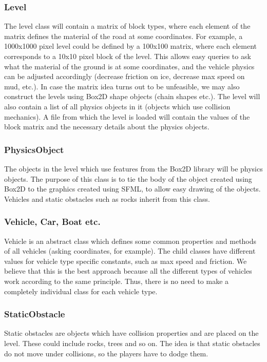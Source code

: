 \documentclass{article}
\begin{document}
\subsubsection*{Level}
The level class will contain a matrix of block types, where each element of the matrix defines the material of the road at some coordinates. For example, a 1000x1000 pixel level could be defined by a 100x100 matrix, where each element corresponds to a 10x10 pixel block of the level. This allows easy queries to ask what the material of the ground is at some coordinates, and the vehicle physics can be adjusted accordingly (decrease friction on ice, decrease max speed on mud, etc.). In case the matrix idea turns out to be unfeasible, we may also construct the levels using Box2D shape objects (chain shapes etc.). The level will also contain a list of all physics objects in it (objects which use collision mechanics). A file from which the level is loaded will contain the values of the block matrix and the necessary details about the physics objects.

\subsubsection*{PhysicsObject}
The objects in the level which use features from the Box2D library will be physics objects. The purpose of this class is to tie the body of the object created using Box2D to the graphics created using SFML, to allow easy drawing of the objects. Vehicles and static obstacles such as rocks inherit from this class.

\subsubsection*{Vehicle, Car, Boat etc.}
Vehicle is an abstract class which defines some common properties and methods of all vehicles (asking coordinates, for example). The child classes have different values for vehicle type specific constants, such as max speed and friction. We believe that this is the best approach because all the different types of vehicles work according to the same principle. Thus, there is no need to make a completely individual class for each vehicle type.

\subsubsection*{StaticObstacle}
Static obstacles are objects which have collision properties and are placed on the level. These could include rocks, trees and so on. The idea is that static obstacles do not move under collisions, so the players have to dodge them.
\end{document}
